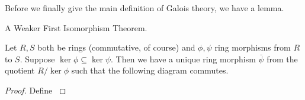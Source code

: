 \documentclass[../book.tex]{subfiles}
\begin{document}
Before we finally give the main definition of Galois theory,
we have a lemma. 

\begin{lem} A Weaker First Isomorphism Theorem. 
    
    Let $R, S$ both be rings (commutative, of course) and
    $\phi, \psi$ ring morphisms from $R$ to $S$. 
    Suppose $\ker \phi \subseteq \ker \psi$. 
    Then we have a unique ring morphism $\bar{\psi}$
    from the quotient $R/\ker \phi$ such that the following diagram commutes.
    \begin{figure}[H]
        \centering
    \end{figure}
\end{lem}
\begin{proof}
    Define $$
\end{proof}
\end{document}
